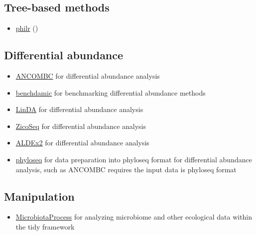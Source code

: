 \documentclass[
]{book}
\providecommand{\tightlist}{%
  \setlength{\itemsep}{0pt}\setlength{\parskip}{0pt}}
\begin{document}
\hypertarget{sub-tree-methods}{%
\subsection{Tree-based methods}\label{sub-tree-methods}}

\begin{itemize}
\tightlist
\item
  \href{http://bioconductor.org/packages/devel/bioc/html/philr.html}{philr} (\citet{Silverman2017})
\end{itemize}

\hypertarget{sub-diff-abund}{%
\subsection{Differential abundance}\label{sub-diff-abund}}

\begin{itemize}
\tightlist
\item
  \href{https://bioconductor.org/packages/devel/bioc/html/ANCOMBC.html}{ANCOMBC} for differential abundance analysis
\item
  \href{https://bioconductor.org/packages/release/bioc/vignettes/benchdamic/inst/doc/intro.html}{benchdamic} for benchmarking differential abundance methods
\item
  \href{https://cran.r-project.org/web/packages/MicrobiomeStat/}{LinDA} for differential abundance analysis
\item
  \href{https://cran.r-project.org/web/packages/GUniFrac/}{ZicoSeq} for differential abundance analysis
\item
  \href{https://www.bioconductor.org/packages/release/bioc/html/ALDEx2.html}{ALDEx2} for differential abundance analysis
\item
  \href{https://www.bioconductor.org/packages/release/bioc/html/phyloseq.html}{phyloseq} for data preparation into phyloseq format for differential abundance analysis, such as ANCOMBC requires the input data is phyloseq format
\end{itemize}

\hypertarget{sub-manipulation}{%
\subsection{Manipulation}\label{sub-manipulation}}

\begin{itemize}
\tightlist
\item
  \href{https://bioconductor.org/packages/release/bioc/html/MicrobiotaProcess.html}{MicrobiotaProcess} for analyzing microbiome and other ecological data within the tidy framework
\end{itemize}
\end{document}
